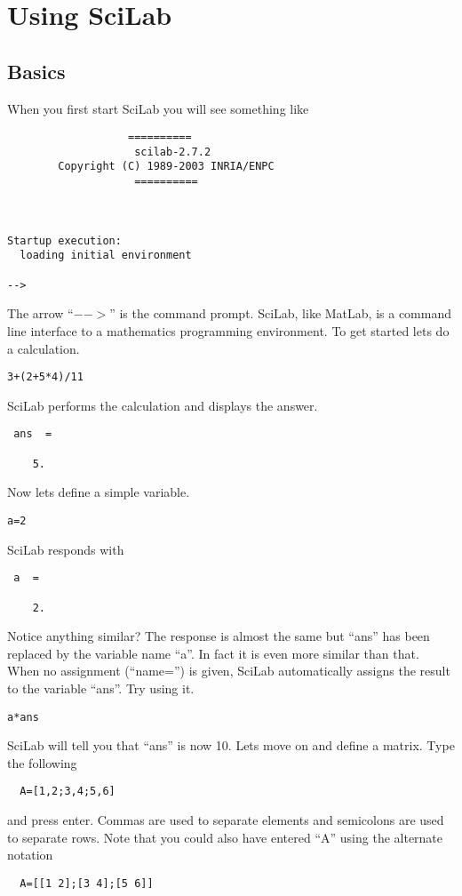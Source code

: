 \chapter{Using SciLab}

\section{Basics}
When you first start SciLab you will see something like
\begin{verbatim}
                   ==========
                    scilab-2.7.2
        Copyright (C) 1989-2003 INRIA/ENPC
                    ==========



Startup execution:
  loading initial environment

-->
\end{verbatim}
The arrow ``$-$$-$$>$'' is the command prompt.  SciLab, like MatLab, is a command line interface to a mathematics programming environment.  To get started lets do a calculation.
\begin{verbatim}
3+(2+5*4)/11
\end{verbatim}
SciLab performs the calculation and displays the answer.
\begin{verbatim}
 ans  =

    5.
\end{verbatim}
Now lets define a simple variable.
\begin{verbatim}
a=2
\end{verbatim}
SciLab responds with
\begin{verbatim}
 a  =

    2.
\end{verbatim}
Notice anything similar?  The response is almost the same but ``ans'' has been replaced by the variable name ``a''.  In fact it is even more similar than that.  When no assignment (``name='') is given, SciLab automatically assigns the result to the variable ``ans''.  Try using it.
\begin{verbatim}
a*ans
\end{verbatim}
SciLab will tell you that ``ans'' is now 10.  Lets move on and define a matrix.  Type the following
\begin{verbatim}
  A=[1,2;3,4;5,6]
\end{verbatim}
and press enter. Commas are used to separate elements and semicolons are used to separate rows.  Note that you could also have entered ``A'' using the alternate notation
\begin{verbatim}
  A=[[1 2];[3 4];[5 6]]
\end{verbatim}
